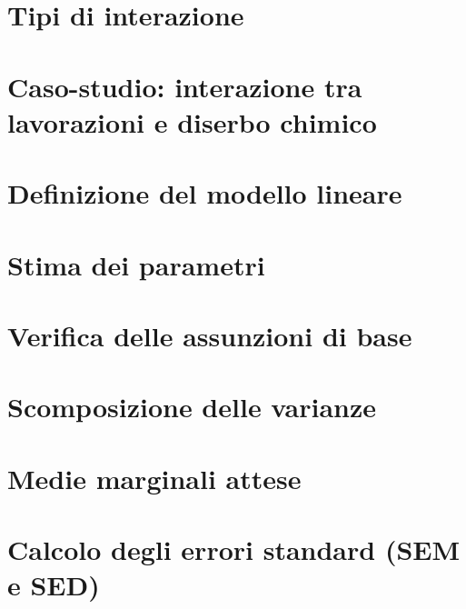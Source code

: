 \documentclass[a4paper,12pt,oneside]{book}
\begin{document}
\hypertarget{tipi-di-interazione}{%
\section{Tipi di interazione}\label{tipi-di-interazione}}

\hypertarget{caso-studio-interazione-tra-lavorazioni-e-diserbo-chimico}{%
\section{Caso-studio: interazione tra lavorazioni e diserbo chimico}\label{caso-studio-interazione-tra-lavorazioni-e-diserbo-chimico}}

\hypertarget{definizione-del-modello-lineare}{%
\section{Definizione del modello lineare}\label{definizione-del-modello-lineare}}

\hypertarget{stima-dei-parametri-2}{%
\section{Stima dei parametri}\label{stima-dei-parametri-2}}

\hypertarget{verifica-delle-assunzioni-di-base}{%
\section{Verifica delle assunzioni di base}\label{verifica-delle-assunzioni-di-base}}

\hypertarget{scomposizione-delle-varianze}{%
\section{Scomposizione delle varianze}\label{scomposizione-delle-varianze}}

\hypertarget{medie-marginali-attese-1}{%
\section{Medie marginali attese}\label{medie-marginali-attese-1}}

\hypertarget{calcolo-degli-errori-standard-sem-e-sed}{%
\section{Calcolo degli errori standard (SEM e SED)}\label{calcolo-degli-errori-standard-sem-e-sed}}
\end{document}
